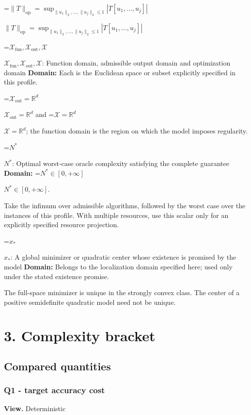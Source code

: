 \documentclass[10pt,a4paper]{article}
\newcommand{\AtlasMath}[1]{\par\begingroup\centering\setbox0=\hbox{$\displaystyle #1$}\ifdim\wd0>1.4\linewidth\typeout{ATLAS WIDE FORMULA: \the\wd0}\fi\ifdim\wd0>\linewidth\resizebox{\linewidth}{!}{\box0}\else\box0\fi\par\endgroup}
\newcommand{\AtlasInlineMath}[1]{\begingroup\setbox0=\hbox{$#1$}\ifdim\wd0>.4\linewidth\endgroup\AtlasMath{#1}\else\endgroup$#1$\fi}
\begin{document}
\AtlasInlineMath{\|T\|_{\mathrm{op}}=\sup_{\|u_1\|_2,\ldots,\|u_j\|_2\le1}|T[u_1,\ldots,u_j]|}



\AtlasInlineMath{\mathcal{X}_{\mathrm{fun}},\mathcal{X}_{\mathrm{out}},\mathcal{X}}: Function domain, admissible output domain and optimization domain \textbf{Domain:} Each is the Euclidean space or subset explicitly specified in this profile.



\AtlasInlineMath{\mathcal{X}_{\mathrm{out}}=\mathbb{R}^d} and \AtlasInlineMath{\mathcal{X}=\mathbb{R}^d}; the function domain is the region on which the model imposes regularity.



\AtlasInlineMath{N^*}: Optimal worst-case oracle complexity satisfying the complete guarantee \textbf{Domain:} \AtlasInlineMath{N^*\in[0,+\infty]}.



Take the infimum over admissible algorithms, followed by the worst case over the instances of this profile. With multiple resources, use this scalar only for an explicitly specified resource projection.



\AtlasInlineMath{x_*}: A global minimizer or quadratic center whose existence is promised by the model \textbf{Domain:} Belongs to the localization domain specified here; used only under the stated existence promise.



The full-space minimizer is unique in the strongly convex class. The center of a positive semidefinite quadratic model need not be unique.



\section{3. Complexity bracket}


\subsection{Compared quantities}


\subsubsection{Q1 - target accuracy cost}


\textbf{View.} Deterministic
\end{document}
